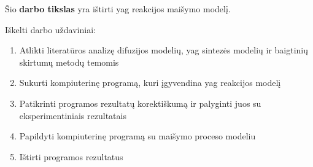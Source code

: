 

Šio \textbf{darbo tikslas} yra ištirti \acs{yag} reakcijos maišymo modelį.

Iškelti darbo uždaviniai:

\begin{enumerate}
\item Atlikti literatūros analizę difuzijos modelių, \acs{yag} sintezės modelių ir baigtinių skirtumų metodų temomis
\item Sukurti kompiuterinę programą, kuri įgyvendina \acs{yag} reakcijos modelį
\item Patikrinti programos rezultatų korektiškumą ir palyginti juos su eksperimentiniais rezultatais
\item Papildyti kompiuterinę programą su maišymo proceso modeliu
\item Ištirti programos rezultatus
\end{enumerate}